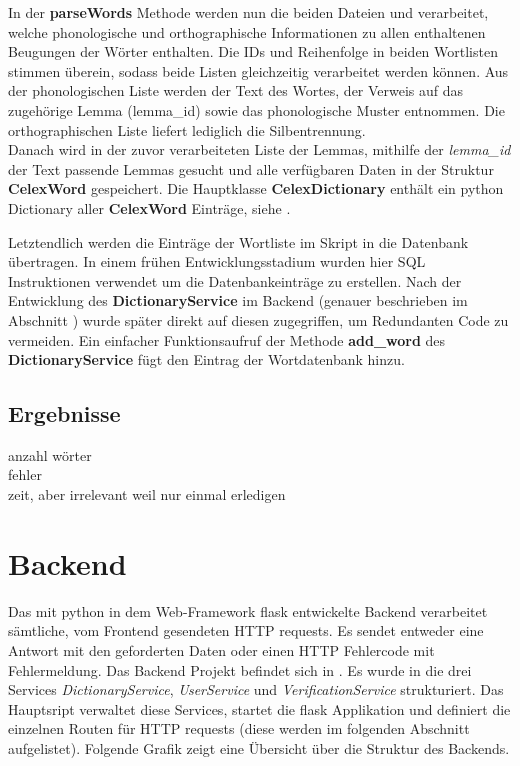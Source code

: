In der \textbf{parseWords} Methode werden nun die beiden Dateien  und  verarbeitet, welche phonologische und orthographische Informationen zu allen enthaltenen Beugungen der Wörter enthalten. Die IDs und Reihenfolge in beiden Wortlisten stimmen überein, sodass beide Listen gleichzeitig verarbeitet werden können. Aus der phonologischen Liste werden der Text des Wortes, der Verweis auf das zugehörige Lemma (lemma\_id) sowie das phonologische Muster entnommen. Die orthographischen Liste liefert lediglich die Silbentrennung.\\
Danach wird in der zuvor verarbeiteten Liste der Lemmas, mithilfe der \textit{lemma\_id} der Text passende Lemmas gesucht und alle verfügbaren Daten in der Struktur \textbf{CelexWord} gespeichert. Die Hauptklasse \textbf{CelexDictionary} enthält ein python Dictionary aller \textbf{CelexWord} Einträge, siehe .

Letztendlich werden die Einträge der Wortliste im Skript  in die Datenbank übertragen. In einem frühen Entwicklungsstadium wurden hier SQL Instruktionen verwendet um die Datenbankeinträge zu erstellen. Nach der Entwicklung des \textbf{DictionaryService} im Backend (genauer beschrieben im Abschnitt ) wurde später direkt auf diesen zugegriffen, um Redundanten Code zu vermeiden. Ein einfacher Funktionsaufruf der Methode \textbf{add\_word} des \textbf{DictionaryService} fügt den Eintrag der Wortdatenbank hinzu.

\subsection{Ergebnisse}

anzahl wörter\\
fehler\\
zeit, aber irrelevant weil nur einmal erledigen


\section{Backend}

Das mit python in dem Web-Framework flask entwickelte Backend verarbeitet sämtliche, vom Frontend gesendeten HTTP requests. Es sendet entweder eine Antwort mit den geforderten Daten oder einen HTTP Fehlercode mit Fehlermeldung. Das Backend Projekt befindet sich in . Es wurde in die drei Services \textit{DictionaryService}, \textit{UserService} und \textit{VerificationService} strukturiert. Das Hauptsript   verwaltet diese Services, startet die flask Applikation und definiert die einzelnen Routen für HTTP requests (diese werden im folgenden Abschnitt aufgelistet). Folgende Grafik zeigt eine Übersicht über die Struktur des Backends.

